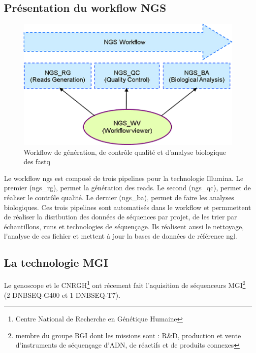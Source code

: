 \subsection{Présentation du workflow NGS}
\begin{minipage}{0.45\textwidth}
	\begin{figure}[H]
		\centering
		\includegraphics[width=1\textwidth]{img/Workflow.png}
		\caption{\footnotesize{Workflow de génération, de contrôle qualité et d’analyse biologique des fastq}}
		\label{worflow-genoscope}
	\end{figure}
\end{minipage} 
\hfill
\begin{minipage}{0.45\textwidth}
	Le workflow ngs est composé de trois pipelines pour la technologie Illumina. Le premier (ngs\_rg), permet la génération des reads. Le second (ngs\_qc), permet de réaliser le contrôle qualité. Le dernier (ngs\_ba), permet de faire les analyses biologiques. Ces trois pipelines sont automatisés dans le workflow et permmettent de réaliser la disribution des données de séquences par projet, de les trier par échantillons, runs et technologies de séquençage. Ils réalisent aussi le nettoyage, l'analyse de ces fichier et mettent à jour la bases de données de référence ngl.
\end{minipage} 

\subsection{La technologie MGI}
Le genoscope et le CNRGH\footnote{Centre National de Recherche en Génétique Humaine} ont récement fait l'aquisition de séquenceurs MGI\footnote{membre du groupe BGI dont les missions sont : R\&D, production et vente d'instruments de séquençage d'ADN, de réactifs et de produits connexes} (2 DNBSEQ-G400 et 1 DNBSEQ-T7).

